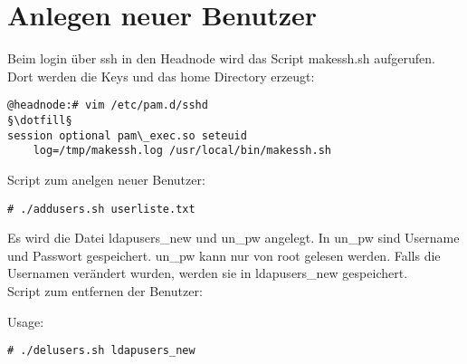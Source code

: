 \section{Anlegen neuer Benutzer}
Beim login über ssh in den Headnode wird das Script makessh.sh aufgerufen.
Dort werden die Keys und das home Directory erzeugt:
\begin{lstlisting}[style=Bash]
@headnode:# vim /etc/pam.d/sshd
§\dotfill§
session optional pam\_exec.so seteuid 
    log=/tmp/makessh.log /usr/local/bin/makessh.sh
\end{lstlisting}
Script zum anelgen neuer Benutzer:

\begin{lstlisting}[style=Bash]
# ./addusers.sh userliste.txt 
\end{lstlisting}
Es wird die Datei ldapusers\_new und un\_pw angelegt.
In un\_pw sind Username und Passwort gespeichert. un\_pw kann nur von root gelesen werden. Falls die Usernamen verändert wurden, werden sie in ldapusers\_new gespeichert.\\
Script zum entfernen der Benutzer:

Usage:
\begin{lstlisting}[style=Bash]
# ./delusers.sh ldapusers_new
\end{lstlisting}
